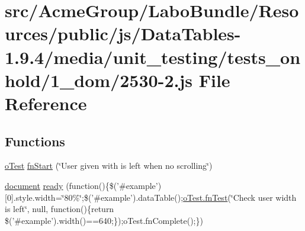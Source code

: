 \hypertarget{2530-2_8js}{\section{src/\+Acme\+Group/\+Labo\+Bundle/\+Resources/public/js/\+Data\+Tables-\/1.9.4/media/unit\+\_\+testing/tests\+\_\+onhold/1\+\_\+dom/2530-\/2.js File Reference}
\label{2530-2_8js}
}
\subsection*{Functions}
\begin{DoxyCompactItemize}
\item 
\hyperlink{unit__test_8js_a3b2d259e2df3b6860d9047a92d09d0d6}{o\+Test} \hyperlink{2530-2_8js_a235d9b2f5d20af518d58be2a8016ff30}{fn\+Start} (\char`\"{}User given with is left when no scrolling\char`\"{})
\item 
\hyperlink{outside_events_8js_aa14f8e0338cced6720590fd2ea13bd4b}{document} \hyperlink{2530-2_8js_a730a95c62a585622a33748681b0c7b56}{ready} (function()\{\$('\#example')\mbox{[}0\mbox{]}.style.\+width=\char`\"{}80\%\char`\"{};\$('\#example').data\+Table();\hyperlink{__zero__config__objects__subarrays_8js_a7f100cfe8617a03cd30c47b5e15396a4}{o\+Test.\+fn\+Test}(\char`\"{}Check user width is left\char`\"{}, null, function()\{return \$('\#example').width()==640;\});o\+Test.\+fn\+Complete();\})
\end{DoxyCompactItemize}


